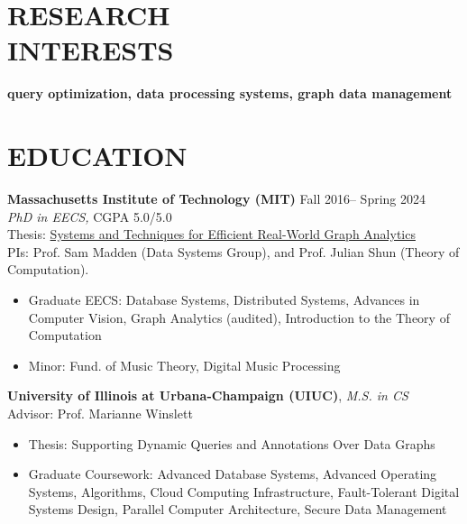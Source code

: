 \documentclass[centered,overlapped]{res}
\begin{document}

\address{jmf@csail.mit.edu, \url{http://joana.fyi}}

\begin{resume}

\section{RESEARCH \\ INTERESTS} \textbf{query optimization, data processing systems, graph data management}

\section{EDUCATION} \textbf{Massachusetts Institute of Technology (MIT)} \hfill Fall 2016-- Spring 2024 \\
  {\sl PhD in EECS,} CGPA 5.0/5.0 \\
  Thesis: \href{https://dspace.mit.edu/handle/1721.1/153832}{Systems and Techniques for Efficient Real-World Graph Analytics}\\
  PIs: Prof. Sam Madden (Data Systems Group), and Prof. Julian Shun (Theory of Computation).
  \begin{itemize}  \itemsep -2pt
  \item Graduate EECS: Database Systems, Distributed Systems, Advances in Computer Vision, Graph Analytics (audited), Introduction to the Theory of Computation
  \item Minor: Fund. of Music Theory, Digital Music Processing
  \end{itemize}

  \textbf{University of Illinois at Urbana-Champaign (UIUC)}, {\sl M.S. in CS} \\ %
  Advisor: Prof. Marianne Winslett
  \begin{itemize}  \itemsep -2pt
  \item Thesis: Supporting Dynamic Queries and Annotations Over Data Graphs
  \item Graduate Coursework: Advanced Database Systems, Advanced Operating Systems, Algorithms, Cloud Computing Infrastructure, Fault-Tolerant Digital Systems Design, Parallel Computer Architecture, Secure Data Management
  \end{itemize}


\end{resume}
\end{document}
